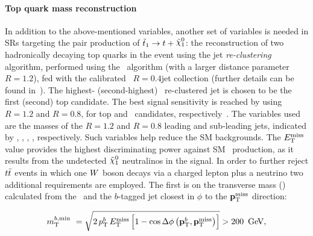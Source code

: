 			\paragraph*{Top quark mass reconstruction}

				In addition to the above-mentioned variables, another set of variables is needed in \acp{SR} targeting the pair production of $\stopone \to t + \ninoone$: the reconstruction of two hadronically decaying top quarks in the event using the jet \emph{re-clustering} algorithm, performed using the \antikt\ algorithm (with a larger distance parameter $R = 1.2$), fed with the calibrated \antikt\ $R = 0.4 $jet collection (further details can be found in~\cite{Antikt2008}). The highest- (second-highest) \pt\ re-clustered jet is chosen to be the first (second) top candidate. The best signal sensitivity is reached by using $R = 1.2$ and $R = 0.8$, for top and \Wboson\ candidates, respectively~\cite{stop0L,ICHEPstop0L}. The variables used are the masses of the $R=1.2$ and $R=0.8$ leading and sub-leading jets, indicated by \mantikttwelvezero, \mantikttwelveone, \mantikteightzero, \mantikteightone, respectively. Such variables help reduce the \ac{SM} backgrounds. %
				The $E_{\mathrm{T}}^{\mathrm{miss}}$ value provides the highest discriminating power against \ac{SM} \ttbar\ production, as it results from the undetected $\ninoone$ neutralinos in the signal. In order to further reject $t\bar{t}$ events in which one $W$ boson decays via a charged lepton plus a neutrino two additional requirements are employed. The first is on the transverse mass (\mt) calculated from the \met\ and the $b$-tagged jet closest in $\phi$ to the $\mathbf{p}_\mathrm{T}^\mathrm{miss}$ direction: 

				\begin{equation*}
					\mtbmin\ = \sqrt{2\,\ptb\,\met \left[1-\cos{\Delta\phi\left(\vecptb,\ptmiss\right)}\right]} > 200\,\GeV,
				\end{equation*}

